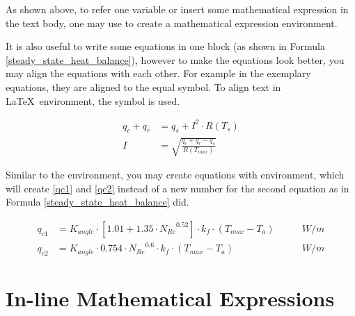 	As shown above, to refer one variable or insert some mathematical expression in the text body, one may use {\color{blue}{\verb|{$ $}|}} to create a mathematical expression environment.
	
	It is also useful to write some equations in one block (as shown in Formula \ref{steady_state_heat_balance}), however to make the equations look better, you may align the equations with each other. For example in the exemplary equations, they are aligned to the equal symbol. To align text in \LaTeX~environment, the {\color{blue}{\verb|&|}} symbol is used.
	
	\begin{align}
		q_c {+} q_r &= q_s + I^2{\cdot}R \left(T_{s} \right)\\
		I &= \sqrt{\frac{q_c{+}q_r{-}q_s}{R \left(T_{max} \right)}} 
		\label{steady_state_heat_balance}
	\end{align}
	
	Similar to the {\color{blue}{\verb|\aligh|}} environment, you may create equations with {\color{blue}{\verb|\subequations|}} environment, which will create \ref{qc1} and \ref{qc2} instead of a new number for the second equation as in Formula \ref{steady_state_heat_balance} did.
	
	\begin{subequations}
		\begin{align}
		q_{c1} &= K_{angle}{\cdot}\left[1.01{+}1.35{\cdot}{N_{Re}}^{0.52} \right] {\cdot} k_f{\cdot}\left(T_{max}{-}T_a\right) \qquad &W/m \label{qc1}\\ 
		q_{c2} &= K_{angle}{\cdot}0.754{\cdot}{N_{Re}}^{0.6} {\cdot} k_f {\cdot}\left(T_{max}{-}T_a\right) \qquad &W/m \label{qc2}
		\end{align}
	\end{subequations}

\section{In-line Mathematical Expressions}

